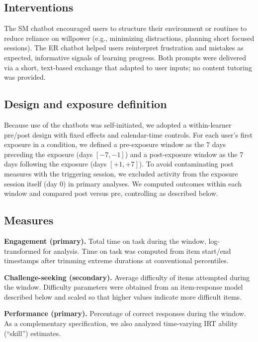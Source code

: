 \documentclass[11pt]{report}
\begin{document}
\begin{mainf}
\subsection{Interventions}
The SM chatbot encouraged users to structure their environment or routines to reduce reliance on willpower (e.g., minimizing distractions, planning short focused sessions).
The ER chatbot helped users reinterpret frustration and mistakes as expected, informative signals of learning progress.
Both prompts were delivered via a short, text-based exchange that adapted to user inputs; no content tutoring was provided.

\subsection{Design and exposure definition}
Because use of the chatbots was self-initiated, we adopted a within-learner pre/post design with fixed effects and calendar-time controls.
For each user’s first exposure in a condition, we defined a pre-exposure window as the 7 days preceding the exposure (days \([-7,-1]\)) and a post-exposure window as the 7 days following the exposure (days \([+1,+7]\)).
To avoid contaminating post measures with the triggering session, we excluded activity from the exposure session itself (day 0) in primary analyses.
We computed outcomes within each window and compared post versus pre, controlling as described below.

\subsection{Measures}
\textbf{Engagement (primary).} Total time on task during the window, log-transformed for analysis. Time on task was computed from item start/end timestamps after trimming extreme durations at conventional percentiles.

\textbf{Challenge-seeking (secondary).} Average difficulty of items attempted during the window. Difficulty parameters were obtained from an item-response model described below and scaled so that higher values indicate more difficult items.

\textbf{Performance (primary).} Percentage of correct responses during the window. As a complementary specification, we also analyzed time-varying IRT ability (``skill'') estimates.


\end{mainf}
\end{document}
